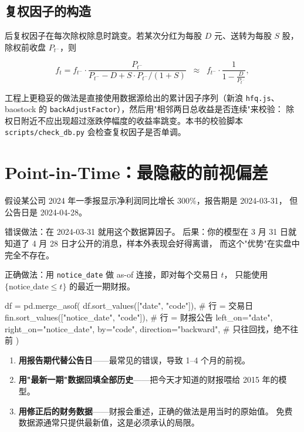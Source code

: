 \subsection{复权因子的构造}

后复权因子在每次除权除息时跳变。若某次分红为每股 $D$ 元、送转为每股 $S$ 股，
除权前收盘 $P_{t^-}$，则

\begin{equation}
  f_{t} = f_{t^-}\cdot\frac{P_{t^-}}{P_{t^-} - D + S\cdot P_{t^-}/(1+S)}
  \;\;\approx\;\; f_{t^-}\cdot\frac{1}{1 - \frac{D}{P_{t^-}}},
  \label{eq:adjfactor}
\end{equation}

工程上更稳妥的做法是直接使用数据源给出的累计因子序列（新浪 \texttt{hfq.js}、
baostock 的 \texttt{backAdjustFactor}），然后用"相邻两日总收益是否连续"来校验：
除权日附近不应出现超过涨跌停幅度的收益率跳变。本书的校验脚本
\texttt{scripts/check\_db.py} 会检查复权因子是否单调。

\section{Point-in-Time：最隐蔽的前视偏差}

假设某公司 2024 年一季报显示净利润同比增长 $300\%$，报告期是 2024-03-31，
但公告日是 2024-04-28。

错误做法：在 2024-03-31 就用这个数据算因子。
后果：你的模型在 3 月 31 日就知道了 4 月 28 日才公开的消息，样本外表现会好得离谱，
而这个"优势"在实盘中完全不存在。

正确做法：用 \texttt{notice\_date} 做 as-of 连接，即对每个交易日 $t$，
只能使用 $\{\text{notice\_date} \le t\}$ 的最近一期财报。

\begin{pycode}[PIT as-of 连接]
df = pd.merge_asof(
    df.sort_values(["date", "code"]),          # 行 = 交易日
    fin.sort_values(["notice_date", "code"]),  # 行 = 财报公告
    left_on="date", right_on="notice_date",
    by="code", direction="backward",           # 只往回找，绝不往前
)
\end{pycode}

\begin{warnbox}[三个容易踩的变体]
\begin{enumerate}
  \item \textbf{用报告期代替公告日}——最常见的错误，导致 1--4 个月的前视。
  \item \textbf{用"最新一期"数据回填全部历史}——把今天才知道的财报喂给 2015 年的模型。
  \item \textbf{用修正后的财务数据}——财报会重述，正确的做法是用当时的原始值。
        免费数据源通常只提供最新值，这是必须承认的局限。
\end{enumerate}
\end{warnbox}

